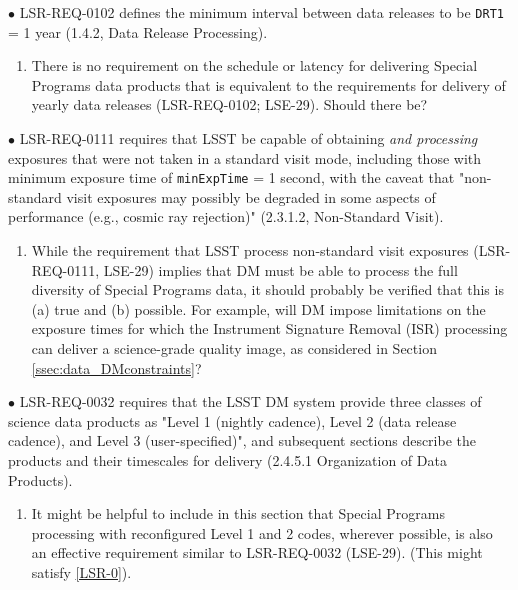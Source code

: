 \documentclass[DM,lsstdraft,toc]{lsstdoc}
\begin{document}
$\bullet$ LSR-REQ-0102 defines the minimum interval between data releases to be {\tt DRT1} = 1 year (1.4.2, Data Release Processing).
\begin{enumerate}[topsep=-10pt,after=\vspace{10pt},label= \textbf{Concern \Roman*.},resume] \item \label{LSR-1} There is no requirement on the schedule or latency for delivering Special Programs data products that is equivalent to the requirements for delivery of yearly data releases (LSR-REQ-0102; LSE-29). Should there be? \end{enumerate}

$\bullet$ LSR-REQ-0111 requires that LSST be capable of obtaining \textit{and processing} exposures that were not taken in a standard visit mode, including those with minimum exposure time of {\tt minExpTime} = 1 second, with the caveat that "non-standard visit exposures may possibly be degraded in some aspects of performance (e.g., cosmic ray rejection)" (2.3.1.2, Non-Standard Visit).
\begin{enumerate}[topsep=-10pt,after=\vspace{10pt},label= \textbf{Concern \Roman*.},resume] \item \label{LSR-2} While the requirement that LSST process non-standard visit exposures (LSR-REQ-0111, LSE-29) implies that DM must be able to process the full diversity of Special Programs data, it should probably be verified that this is (a) true and (b) possible. For example, will DM impose limitations on the exposure times for which the Instrument Signature Removal (ISR) processing can deliver a science-grade quality image, as considered in Section \ref{ssec:data_DMconstraints}? \end{enumerate}

$\bullet$ LSR-REQ-0032 requires that the LSST DM system provide three classes of science data products as "Level 1 (nightly cadence), Level 2 (data release cadence), and Level 3 (user-specified)", and subsequent sections describe the products and their timescales for delivery (2.4.5.1 Organization of Data Products).
\begin{enumerate}[topsep=-10pt,after=\vspace{10pt},label= \textbf{Concern \Roman*.},resume] \item \label{LSR-3} It might be helpful to include in this section that Special Programs processing with reconfigured Level 1 and 2 codes, wherever possible, is also an effective requirement similar to LSR-REQ-0032 (LSE-29). (This might satisfy \ref{LSR-0}). \end{enumerate}
\end{document}
